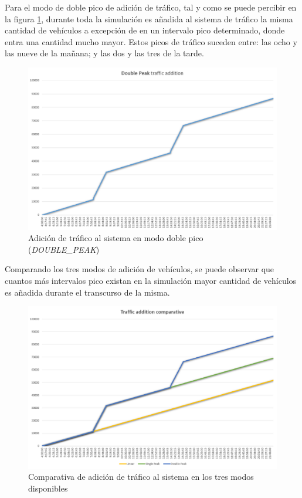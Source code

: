 \newpage
Para el modo de doble pico de adición de tráfico, tal y como se puede percibir en la figura \ref{fig:adicion_trafico_double_peak}, durante toda la simulación es añadida al sistema de tráfico la misma cantidad de vehículos a excepción de en un intervalo pico determinado, donde entra una cantidad mucho mayor. Estos picos de tráfico suceden entre: las ocho y las nueve de la mañana; y las dos y las tres de la tarde.
\begin{figure}[H]
    \centering
    \includegraphics[width=1\linewidth]{text/image/DoublePeak.png}
    \caption{Adición de tráfico al sistema en modo doble pico (\textit{DOUBLE\_PEAK})}
    \label{fig:adicion_trafico_double_peak}
\end{figure}

\newpage
Comparando los tres modos de adición de vehículos, se puede observar que cuantos más intervalos pico existan en la simulación mayor cantidad de vehículos es añadida durante el transcurso de la misma.
\begin{figure}[H]
    \centering
    \includegraphics[width=1\linewidth]{text/image/TrafficAdition.png}
    \caption{Comparativa de adición de tráfico al sistema en los tres modos disponibles}
    \label{fig:adicion_trafico_comparativa}
\end{figure}

